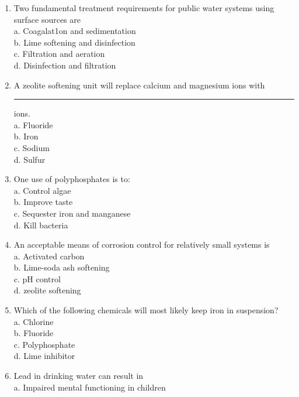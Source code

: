 \documentclass[10pt]{article}
\begin{document}
\begin{enumerate}
\begin{enumerate}
\item Two fundamental treatment requirements for public water systems using surface sources are\\
a. Coagalat1on and sedimentation\\
b. Lime softening and disinfection\\
c. Filtration and aeration \\
d. Disinfection and filtration

\item A zeolite softening unit will replace calcium and magnesium ions with \rule{1.5cm}{0.3mm} ions.\\
a. Fluoride\\
b. Iron\\
c. Sodium\\
d. Sulfur\\

\item One use of polyphosphates is to:\\
a. Control algae\\
b. Improve taste\\
c. Sequester iron and manganese\\
d. Kill bacteria

\item An acceptable means of corrosion control for relatively small systems is\\
a. Activated carbon\\
b. Lime-soda ash softening\\
c. pH control\\
d. zeolite softening



\item Which of the following chemicals will most likely keep iron in suspension?\\


a. Chlorine\\

b. Fluoride\\

c. Polyphosphate\\

d. Lime inhibitor\\


\item Lead in drinking water can result in\\


a. Impaired mental functioning in children\\


\end{enumerate}
\end{enumerate}
\end{document}
